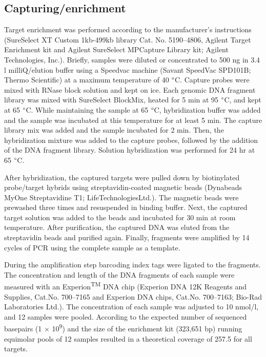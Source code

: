 \subsection{Capturing/enrichment}
Target enrichment was performed according to the manufacturer’s instructions (SureSelect XT Custom 1kb-499kb library Cat. No. 5190–4806, Agilent Target Enrichment kit and Agilent SureSelect MPCapture Library kit; Agilent Technologies, Inc.).
Briefly, samples were diluted or concentrated to 500 ng in 3.4 {\textmu}l milliQ/elution buffer using a Speedvac machine (Savant SpeedVac SPD101B; Thermo Scientific) at a maximum temperature of 40 $\degree$C. 
Capture probes were mixed with RNase block solution and kept on ice. 
Each genomic DNA fragment library was mixed with SureSelect BlockMix, heated for 5 min at 95 $\degree$C, and kept at 65 $\degree$C. While maintaining the sample at 65 $\degree$C, hybridization buffer was added and the sample was incubated at this temperature for at least 5 min. 
The capture library mix was added and the sample incubated for 2 min. 
Then, the hybridization mixture was added to the capture probes, followed by the addition of the DNA fragment library. 
Solution hybridization was performed for 24 hr at 65 $\degree$C. 

After hybridization, the captured targets were pulled down by biotinylated probe/target hybrids using streptavidin-coated magnetic beads (Dynabeads MyOne Streptavidine T1; LifeTechnologiesLtd.). 
The magnetic beads were prewashed three times and resuspended in binding buffer. 
Next, the captured target solution was added to the beads and incubated for 30 min at room temperature. 
After purification, the captured DNA was eluted from the streptavidin beads and purified again. 
Finally, fragments were amplified by 14 cycles of PCR using the complete sample as a template. 

During the amplification step barcoding index tags were ligated to the fragments. 
The concentration and length of the DNA fragments of each sample were measured with an Experion\textsuperscript{TM} DNA chip (Experion DNA 12K Reagents and Supplies, Cat.No. 700–7165 and Experion DNA chips, Cat.No. 700–7163; Bio-Rad Laboratories Ltd.). 
The concentration of each sample was adjusted to 10 nmol/l, and 12 samples were pooled. 
According to the expected number of sequenced basepairs (1 $\times$ 10\textsuperscript{9}) and the size of the enrichment kit (323,651 bp) running equimolar pools of 12 samples resulted in a theoretical coverage of 257.5 for all targets.

